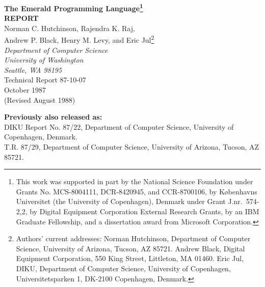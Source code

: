 \begin{titlepage}
\vspace*{1.00in}
\begin{center}
\Large
{\bf The Emerald Programming Language\footnote{This work was 
supported in part
by the National Science Foundation under Grants No. 
MCS-8004111, DCR-8420945, and CCR-8700106, by
K{\o}benhavns Universitet (the University of Copenhagen), Denmark under
Grant J.nr.\ 574-2,2, by Digital Equipment Corporation
External Research Grants, by an IBM Graduate Fellowship,
and a dissertation award from Microsoft Corporation.}} \\[0.08in]
\large
{\bf REPORT} \\
\large
\vspace{2.5ex}
Norman C. Hutchinson, Rajendra K. Raj, \\
Andrew P. Black, Henry M. Levy, and Eric Jul\footnote{Authors' current 
addresses:  
Norman Hutchinson, Department of Computer Science, University of
Arizona, Tucson, AZ 85721.  
Andrew Black, Digital Equipment Corporation, 550 King Street, Littleton, MA 01460.
Eric Jul, DIKU, Department of Computer Science, University of Copenhagen, 
Universitetsparken 1, DK-2100 Copenhagen, Denmark.} \\
\vspace{2.0ex}
\normalsize
{\em Department of Computer Science \\
University of Washington \\
Seattle, WA 98195} \\
\vspace{2.0ex}
Technical Report 87-10-07\\
October 1987\\
(Revised August 1988)
\end{center}
\vspace*{0.4in}
\begin{center}
\parbox{6.0in}{
{\bf Previously also released as:}\\[0.15in]
DIKU Report No. 87/22, Department of Computer Science, University of Copenhagen, Denmark.\\
T.R. 87/29, Department of Computer Science, University of Arizona, Tucson, AZ 85721.\\
}
\end{center}
\vspace*{0.2in}


\end{titlepage}
